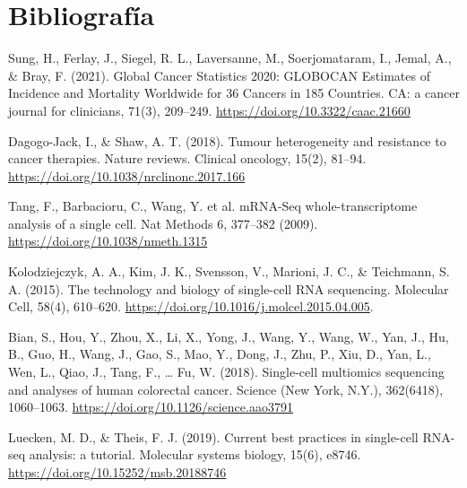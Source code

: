 \documentclass[11pt]{article}
\begin{document}
	
	\section{Bibliografía}
	
	\begin{enumerate}[label={[\arabic*]}]

		\item Sung, H., Ferlay, J., Siegel, R. L., Laversanne, M., Soerjomataram, I., Jemal, A., \& Bray, F. (2021). Global Cancer Statistics 2020: GLOBOCAN Estimates of Incidence and Mortality Worldwide for 36 Cancers in 185 Countries. CA: a cancer journal for clinicians, 71(3), 209–249. \url{https://doi.org/10.3322/caac.21660} \label{bib:globocan}
		
		\item Dagogo-Jack, I., \& Shaw, A. T. (2018). Tumour heterogeneity and resistance to cancer therapies. Nature reviews. Clinical oncology, 15(2), 81–94. \url{https://doi.org/10.1038/nrclinonc.2017.166} \label{bib:tumor_hetereogeneity}
		
		\item Tang, F., Barbacioru, C., Wang, Y. et al. mRNA-Seq whole-transcriptome analysis of a single cell. Nat Methods 6, 377–382 (2009). \url{https://doi.org/10.1038/nmeth.1315} \label{bib:RNA_seq_trad_1}
		
		\item Kolodziejczyk, A. A., Kim, J. K., Svensson, V., Marioni, J. C., \& Teichmann, S. A. (2015). The technology and biology of single-cell RNA sequencing. Molecular Cell, 58(4), 610–620. \url{https://doi.org/10.1016/j.molcel.2015.04.005}. \label{bib:RNA_seq_trad_2}
		
		\item Bian, S., Hou, Y., Zhou, X., Li, X., Yong, J., Wang, Y., Wang, W., Yan, J., Hu, B., Guo, H., Wang, J., Gao, S., Mao, Y., Dong, J., Zhu, P., Xiu, D., Yan, L., Wen, L., Qiao, J., Tang, F., … Fu, W. (2018). Single-cell multiomics sequencing and analyses of human colorectal cancer. Science (New York, N.Y.), 362(6418), 1060–1063. \url{https://doi.org/10.1126/science.aao3791} \label{bib:PAPER}
		
		\item Luecken, M. D., \& Theis, F. J. (2019). Current best practices in single-cell RNA-seq analysis: a tutorial. Molecular systems biology, 15(6), e8746. \url{https://doi.org/10.15252/msb.20188746} \label{bib:tutorial}
	
	
	\end{enumerate}
	
\end{document}
